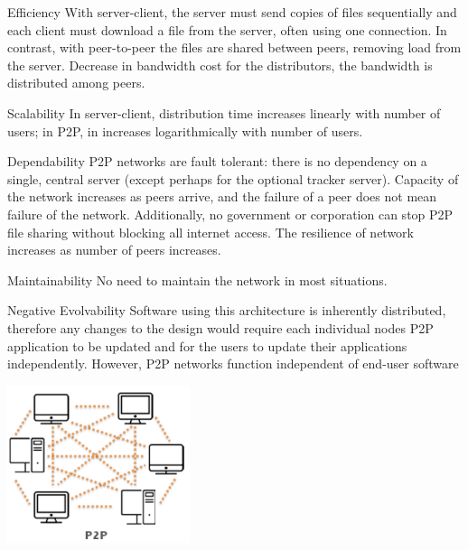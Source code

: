 \begin{nfps}
\item[Efficiency] With server-client, the server must send copies of files
    sequentially and each client must download a file from the server, often
    using one connection. In contrast, with peer-to-peer the files are shared
    between peers, removing load from the server. Decrease in bandwidth cost
    for the distributors, the bandwidth is distributed among peers.

\item[Scalability] In server-client, distribution time increases linearly with
    number of users; in P2P, in increases logarithmically with number of users. 

\item[Dependability] P2P networks are fault tolerant: there is no dependency on
    a single, central server (except perhaps for the optional tracker server). 
    Capacity of the network increases as peers arrive, and the failure of a
    peer does not mean failure of the network. Additionally, no government or
    corporation can stop P2P file sharing without blocking all internet access.
    The resilience of network increases as number of peers increases. 

\item[Maintainability] No need to maintain the network in most situations.

\item[Negative Evolvability] Software using this architecture is inherently
    distributed, therefore any changes to the design would require each
    individual nodes P2P application to be updated and for the users to update
    their applications independently. However, P2P networks function
    independent of end-user software
\end{nfps}

\begin{center}
    \includegraphics[width=0.4\textwidth]{./peer-to-peer}
\end{center}
